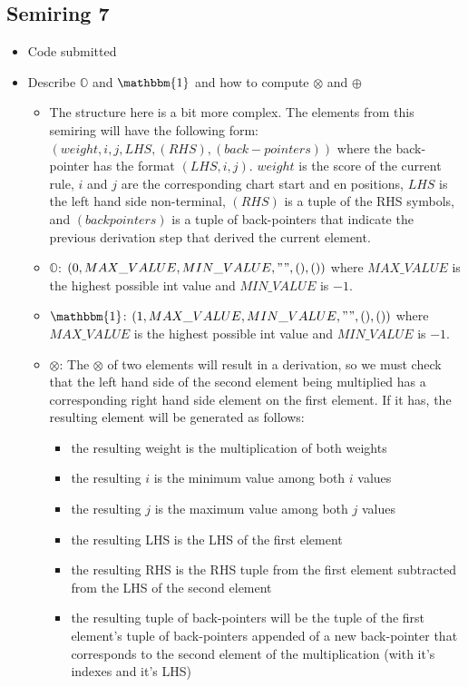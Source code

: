 \documentclass{article}
\begin{document}
\begin{spacing}{1.1}
\subsection{Semiring 7}
\begin{itemize}
	\item Code submitted
	\item Describe $\mathbb{O}$ and $\mathbbm{1}$ and how to compute $\otimes$ and $\oplus$
	\begin{itemize}
		\item The structure here is a bit more complex. The elements from this semiring will have the following form: $(weight, i, j, LHS, (RHS), (back-pointers))$ where the back-pointer has the format $(LHS,i,j)$. $weight$ is the score of the current rule, $i$ and $j$ are the corresponding chart start and en positions, $LHS$ is the left hand side non-terminal, $(RHS)$ is a tuple of the RHS symbols, and $(backpointers)$ is a tuple of back-pointers that indicate the previous derivation step that derived the current element.
		\item $\mathbb{O}$: $(0,MAX\_VALUE,MIN\_VALUE,"",(),())$ where $MAX\_VALUE$ is the highest possible int value and $MIN\_VALUE$ is $-1$.
		\item $\mathbbm{1}$:  $(1,MAX\_VALUE,MIN\_VALUE,"",(),())$ where $MAX\_VALUE$ is the highest possible int value and $MIN\_VALUE$ is $-1$.
		\item $\otimes$: The $\otimes$ of two elements will result in a derivation, so we must check that the left hand side of the second element being multiplied has a corresponding right hand side element on the first element. If it has, the resulting element will be generated as follows:
		\begin{itemize}
			\item the resulting weight is the multiplication of both weights
			\item the resulting $i$ is the minimum value among both $i$ values
			\item the resulting $j$ is the maximum value among both $j$ values
			\item the resulting LHS is the LHS of the first element
			\item the resulting RHS is the RHS tuple from the first element subtracted from the LHS of the second element
			\item the resulting tuple of back-pointers will be the tuple of the first element's tuple of back-pointers appended of a new back-pointer that corresponds to the second element of the multiplication (with it's indexes and it's LHS)

\end{itemize}
\end{itemize}
\end{itemize}
\end{spacing}
\end{document}
